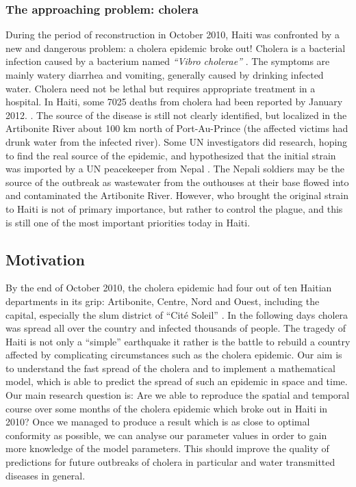 \documentclass[11pt]{article}
\begin{document}
\subsubsection*{The approaching problem: cholera}
During the period of reconstruction in October 2010, Haiti was confronted by a new and dangerous problem: a cholera epidemic broke out! Cholera is a bacterial infection caused by a bacterium named \textit{“Vibro cholerae”} \citep{pacini:1959}. The symptoms are mainly watery diarrhea and vomiting, generally caused by drinking infected water. Cholera need not be lethal but requires appropriate treatment in a hospital. In Haiti, some 7025 deaths from cholera had been reported by January 2012. \cite{web:MSPP}.
The source of the disease is still not clearly identified, but localized in the Artibonite River about 100 km north of Port-Au-Prince (the affected victims had drunk water from the infected river). Some UN investigators did research, hoping to find the real source of the epidemic, and hypothesized that the initial strain was imported by a UN peacekeeper from Nepal \cite{web:alj}. The Nepali soldiers may be the source of the outbreak as wastewater from the outhouses at their base flowed into and contaminated the Artibonite River. However, who brought the original strain to Haiti is not of primary importance, but rather to control the plague, and this is still one of the most important priorities today in Haiti.

\subsection{Motivation}
By the end of October 2010, the cholera epidemic had four out of ten Haitian departments in its grip: Artibonite, Centre, Nord and Ouest, including the capital, especially the slum district of “Cit\'{e} Soleil” \cite{web:alj2}. In the following days cholera was spread all over the country and infected thousands of people. The tragedy of Haiti is not only a “simple” earthquake it rather is the battle to rebuild a country affected by complicating circumstances such as the cholera epidemic. Our aim is to understand the fast spread of the cholera and to implement a mathematical model, which is able to predict the spread of such an epidemic in space and time. Our main research question is: Are we able to reproduce the spatial and temporal course over some months of the cholera epidemic which broke out in Haiti in 2010? Once we managed to produce a result which is as close to optimal conformity as possible, we can analyse our parameter values in order to gain more knowledge of the model parameters. This should improve the quality of predictions for future outbreaks of cholera in particular and water transmitted diseases in general.
\end{document}
